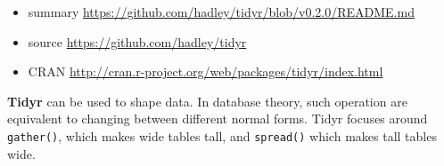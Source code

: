 \documentclass[]{article}
\begin{document}
\begin{itemize}
\itemsep1pt\parskip0pt
\item
  summary \url{https://github.com/hadley/tidyr/blob/v0.2.0/README.md}
\item
  source \url{https://github.com/hadley/tidyr}
\item
  CRAN \url{http://cran.r-project.org/web/packages/tidyr/index.html}
\end{itemize}

\textbf{Tidyr} can be used to shape data. In database theory, such
operation are equivalent to changing between different normal forms.
Tidyr focuses around \texttt{gather()}, which makes wide tables tall,
and \texttt{spread()} which makes tall tables wide.
\end{document}
